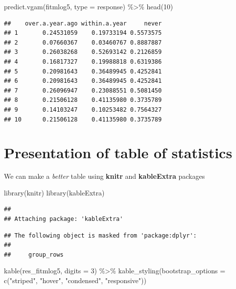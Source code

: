 \documentclass[
  10pt,
]{krantz}
\newenvironment{Shaded}{\begin{snugshade}}{\end{snugshade}}
\newcommand{\AttributeTok}[1]{\textcolor[rgb]{0.77,0.63,0.00}{#1}}
\newcommand{\DecValTok}[1]{\textcolor[rgb]{0.00,0.00,0.81}{#1}}
\newcommand{\FunctionTok}[1]{\textcolor[rgb]{0.00,0.00,0.00}{#1}}
\newcommand{\NormalTok}[1]{#1}
\newcommand{\SpecialCharTok}[1]{\textcolor[rgb]{0.00,0.00,0.00}{#1}}
\newcommand{\StringTok}[1]{\textcolor[rgb]{0.31,0.60,0.02}{#1}}
\begin{document}
\begin{Shaded}
\begin{Highlighting}[]
\FunctionTok{predict.vgam}\NormalTok{(fitmlog5, }\AttributeTok{type =} \StringTok{\textquotesingle{}response\textquotesingle{}}\NormalTok{) }\SpecialCharTok{\%\textgreater{}\%} 
  \FunctionTok{head}\NormalTok{(}\DecValTok{10}\NormalTok{)}
\end{Highlighting}
\end{Shaded}

\begin{verbatim}
##    over.a.year.ago within.a.year     never
## 1       0.24531059    0.19733194 0.5573575
## 2       0.07660367    0.03460767 0.8887887
## 3       0.26038268    0.52693142 0.2126859
## 4       0.16817327    0.19988818 0.6319386
## 5       0.20981643    0.36489945 0.4252841
## 6       0.20981643    0.36489945 0.4252841
## 7       0.26096947    0.23088551 0.5081450
## 8       0.21506128    0.41135980 0.3735789
## 9       0.14103247    0.10253482 0.7564327
## 10      0.21506128    0.41135980 0.3735789
\end{verbatim}

\hypertarget{presentation-of-table-of-statistics}{%
\section{Presentation of table of statistics}\label{presentation-of-table-of-statistics}}

We can make a \emph{better} table using \textbf{knitr} and \textbf{kableExtra} packages

\begin{Shaded}
\begin{Highlighting}[]
\FunctionTok{library}\NormalTok{(knitr)}
\FunctionTok{library}\NormalTok{(kableExtra)}
\end{Highlighting}
\end{Shaded}

\begin{verbatim}
## 
## Attaching package: 'kableExtra'
\end{verbatim}

\begin{verbatim}
## The following object is masked from 'package:dplyr':
## 
##     group_rows
\end{verbatim}

\begin{Shaded}
\begin{Highlighting}[]
\FunctionTok{kable}\NormalTok{(res\_fitmlog5, }\AttributeTok{digits =} \DecValTok{3}\NormalTok{) }\SpecialCharTok{\%\textgreater{}\%}
  \FunctionTok{kable\_styling}\NormalTok{(}\AttributeTok{bootstrap\_options =} 
                  \FunctionTok{c}\NormalTok{(}\StringTok{"striped"}\NormalTok{, }\StringTok{"hover"}\NormalTok{, }\StringTok{"condensed"}\NormalTok{, }\StringTok{"responsive"}\NormalTok{))}
\end{Highlighting}
\end{Shaded}
\end{document}
